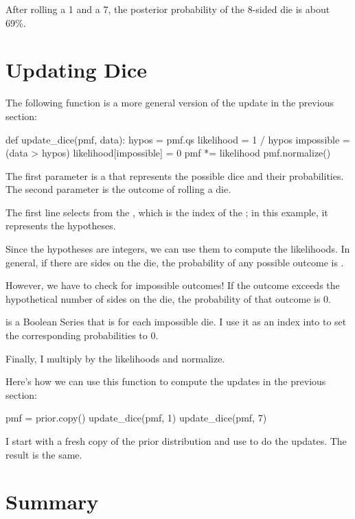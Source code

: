 \documentclass[12pt]{book}
\theoremstyle{exercise}
\begin{document}


After rolling a 1 and a 7, the posterior probability of the 8-sided die is about 69\%.


\section{Updating Dice}
\label{dice2}

The following function is a more general version of the update in the previous section:

\begin{code}
def update_dice(pmf, data):
    hypos = pmf.qs
    likelihood = 1 / hypos
    impossible = (data > hypos)
    likelihood[impossible] = 0
    pmf *= likelihood
    pmf.normalize()
\end{code}

The first parameter is a  that represents the possible dice and their probabilities.
The second parameter is the outcome of rolling a die.

The first line selects  from the , which is the index of the ; in this example, it represents the hypotheses.

Since the hypotheses are integers, we can use them to compute the likelihoods.
In general, if there are  sides on the die, the probability of any possible outcome is .

However, we have to check for impossible outcomes!
If the outcome exceeds the hypothetical number of sides on the die, the probability of that outcome is $0$.

 is a Boolean Series that is  for each impossible die.
I use it as an index into  to set the corresponding probabilities to $0$.

Finally, I multiply  by the likelihoods and normalize.

Here's how we can use this function to compute the updates in the previous section:
 
\begin{code}
pmf = prior.copy()
update_dice(pmf, 1)
update_dice(pmf, 7)
\end{code}

I start with a fresh copy of the prior distribution and use  to do the updates.
The result is the same.


\section{Summary}
\end{document}
